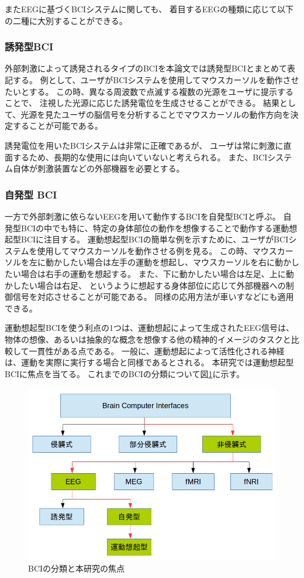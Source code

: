 またEEGに基づくBCIシステムに関しても、
着目するEEGの種類に応じて以下の二種に大別することができる。
\subsubsection{{\mc 誘発型}\rm BCI}
外部刺激によって誘発されるタイプのBCIを本論文では誘発型BCIとまとめて表記する。
例として、ユーザがBCIシステムを使用してマウスカーソルを動作させたいとする。 
この時、異なる周波数で点滅する複数の光源をユーザに提示することで、
注視した光源に応じた誘発電位を生成させることができる\cite{SSVEP}。
結果として、光源を見たユーザの脳信号を分析することでマウスカーソルの動作方向を決定することが可能である。

誘発電位を用いたBCIシステムは非常に正確であるが、
ユーザは常に刺激に直面するため、長期的な使用には向いていないと考えられる。
また、BCIシステム自体が刺激装置などの外部機器を必要とする。
\subsubsection{\mc 自発型 \rm BCI}
一方で外部刺激に依らないEEGを用いて動作するBCIを自発型BCIと呼ぶ。
自発型BCIの中でも特に、特定の身体部位の動作を想像することで動作する運動想起型BCIに注目する。
運動想起型BCIの簡単な例を示すために、ユーザがBCIシステムを使用してマウスカーソルを動作させる例を見る。
この時、マウスカーソルを左に動かしたい場合は左手の運動を想起し、マウスカーソルを右に動かしたい場合は右手の運動を想起する。
また、下に動かしたい場合は左足、上に動かしたい場合は右足、
というように想起する身体部位に応じて外部機器への制御信号を対応させることが可能である。
同様の応用方法が車いすなどにも適用できる。

運動想起型BCIを使う利点の1つは、運動想起によって生成されたEEG信号は、
物体の想像、あるいは抽象的な概念を想像する他の精神的イメージのタスクと比較して一貫性がある点である。
一般に、運動想起によって活性化される神経は、運動を実際に実行する場合と同様であるとされる\cite{運動想起}。
本研究では運動想起型BCIに焦点を当てる。
これまでのBCIの分類について図\ref{fig:BCIclass}に示す。

\begin{figure}[tb]
    \centering
    \includegraphics[width=13cm]{images/BCIclass.png}
    \caption{BCIの分類と本研究の焦点}
    \label{fig:BCIclass}
\end{figure}


